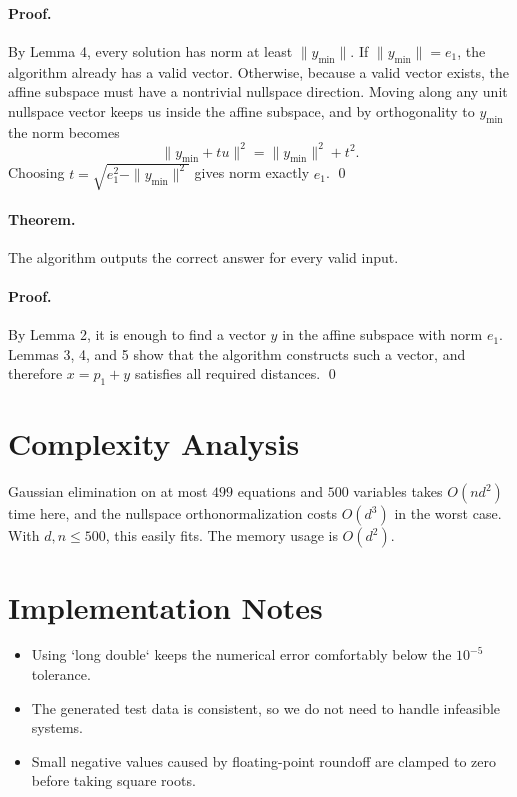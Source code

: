 \documentclass[11pt]{article}
\begin{document}
\paragraph{Proof.}
By Lemma 4, every solution has norm at least $\|y_{\min}\|$.
If $\|y_{\min}\|=e_1$, the algorithm already has a valid vector.
Otherwise, because a valid vector exists, the affine subspace must have a nontrivial nullspace direction.
Moving along any unit nullspace vector keeps us inside the affine subspace, and by orthogonality to
$y_{\min}$ the norm becomes
\[
    \|y_{\min} + t u\|^2 = \|y_{\min}\|^2 + t^2.
\]
Choosing $t = \sqrt{e_1^2 - \|y_{\min}\|^2}$ gives norm exactly $e_1$. \qed

\paragraph{Theorem.}
The algorithm outputs the correct answer for every valid input.

\paragraph{Proof.}
By Lemma 2, it is enough to find a vector $y$ in the affine subspace with norm $e_1$.
Lemmas 3, 4, and 5 show that the algorithm constructs such a vector, and therefore $x=p_1+y$ satisfies
all required distances. \qed

\section*{Complexity Analysis}

Gaussian elimination on at most $499$ equations and $500$ variables takes $O(nd^2)$ time here, and the
nullspace orthonormalization costs $O(d^3)$ in the worst case. With $d,n \le 500$, this easily fits.
The memory usage is $O(d^2)$.

\section*{Implementation Notes}

\begin{itemize}[leftmargin=*]
    \item Using `long double` keeps the numerical error comfortably below the $10^{-5}$ tolerance.
    \item The generated test data is consistent, so we do not need to handle infeasible systems.
    \item Small negative values caused by floating-point roundoff are clamped to zero before taking square
    roots.
\end{itemize}
\end{document}

